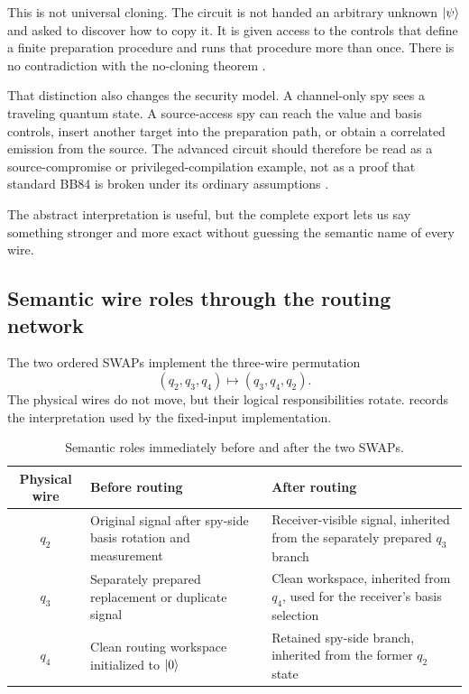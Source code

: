 This is not universal cloning. The circuit is not handed an arbitrary unknown
$\ket{\psi}$ and asked to discover how to copy it. It is given access to the
controls that define a finite preparation procedure and runs that procedure
more than once. There is no contradiction with the no-cloning theorem
\cite{wootters1982cloning}.

That distinction also changes the security model. A channel-only spy sees a
traveling quantum state. A source-access spy can reach the value and basis
controls, insert another target into the preparation path, or obtain a
correlated emission from the source. The advanced circuit should therefore be
read as a source-compromise or privileged-compilation example, not as a proof
that standard BB84 is broken under its ordinary assumptions
\cite{tamaki2014loss,jiang2024sidechannel}.

The abstract interpretation is useful, but the complete export lets us say
something stronger and more exact without guessing the semantic name of every
wire.

\subsection{Semantic wire roles through the routing network}

The two ordered SWAPs implement the three-wire permutation
\begin{equation}
  (q_2,q_3,q_4)\longmapsto(q_3,q_4,q_2).
  \label{eq:caseii-semantic-permutation}
\end{equation}
The physical wires do not move, but their logical responsibilities rotate.
 records the interpretation used by the
fixed-input implementation.

\begin{table}[ht]
\centering
\caption{Semantic roles immediately before and after the two SWAPs.}
\label{tab:caseii-semantic-routing}
\begin{tabularx}{\textwidth}{@{}cXX@{}}
\toprule
Physical wire & Before routing & After routing \\
\midrule
$q_2$ & Original signal after spy-side basis rotation and measurement &
Receiver-visible signal, inherited from the separately prepared $q_3$ branch \\
$q_3$ & Separately prepared replacement or duplicate signal & Clean workspace,
inherited from $q_4$, used for the receiver's basis selection \\
$q_4$ & Clean routing workspace initialized to $\ket{0}$ & Retained spy-side
branch, inherited from the former $q_2$ state \\
\bottomrule
\end{tabularx}
\end{table}

